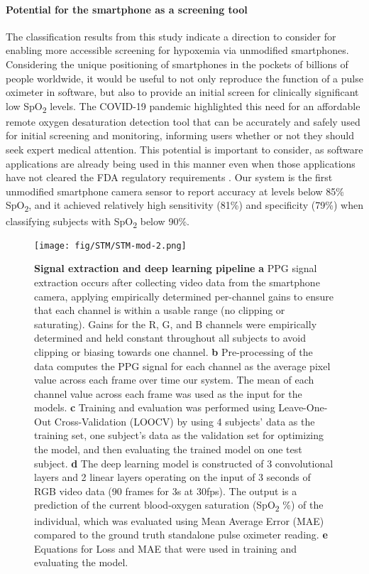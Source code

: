 \documentclass[12pt]{article}
\begin{document}
\paragraph*{Potential for the smartphone as a screening tool}
The classification results from this study indicate a direction to consider for enabling more accessible screening for hypoxemia via unmodified smartphones. Considering the unique positioning of smartphones in the pockets of billions of people worldwide, it would be useful to not only reproduce the function of a pulse oximeter in software, but also to provide an initial screen for clinically significant low SpO\textsubscript{2} levels. The COVID-19 pandemic highlighted this need for an affordable remote oxygen desaturation detection tool that can be accurately and safely used for initial screening and monitoring, informing users whether or not they should seek expert medical attention. This potential is important to consider, as software applications are already being used in this manner even when those applications have not cleared the FDA regulatory requirements \cite{jordan2020utility,digidoc2013plsox}.
Our system is the first unmodified smartphone camera sensor to report accuracy at levels below 85\% SpO\textsubscript{2}, and it achieved relatively high sensitivity (81\%) and specificity (79\%) when classifying subjects with SpO\textsubscript{2} below 90\%. 

\begin{figure}[t!]
    \texttt{[image: fig/STM/STM-mod-2.png]}
    \caption{\textbf{Signal extraction and deep learning pipeline}
    \textbf{a} PPG signal extraction occurs after collecting video data from the smartphone camera, applying empirically determined per-channel gains to ensure that each channel is within a usable range (no clipping or saturating). Gains for the R, G, and B channels were empirically determined and held constant throughout all subjects to avoid clipping or biasing towards one channel.
    \textbf{b} Pre-processing of the data computes the PPG signal for each channel as the average pixel value across each frame over time our system. The mean of each channel value across each frame was used as the input for the models.
    \textbf{c} Training and evaluation was performed using Leave-One-Out Cross-Validation (LOOCV) by using 4 subjects' data as the training set, one subject's data as the validation set for optimizing the model, and then evaluating the trained model on one test subject.
    \textbf{d} The deep learning model is constructed of 3 convolutional layers and 2 linear layers operating on the input of 3 seconds of RGB video data (90 frames for 3s at 30fps).  The output is a prediction of the current blood-oxygen saturation (SpO\textsubscript{2} \%) of the individual, which was evaluated using Mean Average Error (MAE) compared to the ground truth standalone pulse oximeter reading.
    \textbf{e} Equations for Loss and MAE that were used in training and evaluating the model.}
    \label{dl}
\end{figure}
\end{document}
